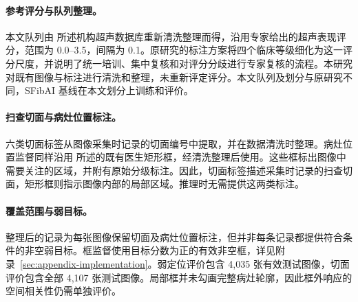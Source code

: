 \paragraph{参考评分与队列整理。}
本文队列由 \citet{xu2026sfibai} 所述机构超声数据库重新清洗整理而得，沿用专家给出的超声表现评分，范围为 0.0--3.5，间隔为 0.1。原研究的标注方案将四个临床等级细化为这一评分尺度，并说明了统一培训、集中复核和对评分分歧进行专家复核的流程。本研究对既有图像与标注进行清洗和整理，未重新评定评分。本文队列及划分与原研究不同，SFibAI 基线在本文划分上训练和评价。

\paragraph{扫查切面与病灶位置标注。}
六类切面标签从图像采集时记录的切面编号中提取，并在数据清洗时整理。病灶位置监督同样沿用 \citet{xu2026sfibai} 所述的既有医生矩形框，经清洗整理后使用。这些框标出图像中需要关注的区域，并附有原始分级标注。因此，切面标签描述采集时记录的扫查切面，矩形框则指示图像内部的局部区域。推理时无需提供这两类标注。

\paragraph{覆盖范围与弱目标。}
整理后的记录为每张图像保留切面及病灶位置标注，但并非每条记录都提供符合条件的非空弱目标。框监督使用目标分数为正的有效非空框，详见附录~\ref{sec:appendix-implementation}。弱定位评价包含 4,035 张有效测试图像，切面评价包含全部 4,107 张测试图像。局部框并未勾画完整病灶轮廓，因此框外响应的空间相关性仍需单独评价。
